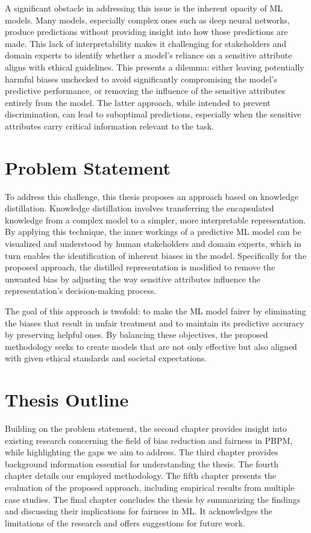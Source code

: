 A significant obstacle in addressing this issue is the inherent opacity of ML models.
Many models, especially complex ones such as deep neural networks,
produce predictions without providing insight into how those predictions are made.
This lack of interpretability makes it challenging for stakeholders and domain experts
to identify whether a model's reliance on a sensitive attribute aligns with ethical guidelines. 
This presents a dilemma:
either leaving potentially harmful biases unchecked to avoid significantly compromising
the model's predictive performance,
or removing the influence of the sensitive attributes entirely from the model.
The latter approach, while intended to prevent discrimination, can lead to suboptimal predictions,
especially when the sensitive attributes carry critical information relevant to the task.

\section{Problem Statement}
To address this challenge,
this thesis proposes an approach based on knowledge distillation.
Knowledge distillation involves transferring the encapsulated knowledge from a complex model to a simpler,
more interpretable representation.
By applying this technique,
the inner workings of a predictive ML model can be visualized
and understood by human stakeholders and domain experts,
which in turn enables the identification of inherent biases in the model.
Specifically for the proposed approach,
the distilled representation is modified to remove the unwanted bias
by adjusting the way sensitive attributes influence the representation's decision-making process.

The goal of this approach is twofold:
to make the ML model fairer by eliminating the biases that result in unfair treatment
and to maintain its predictive accuracy by preserving helpful ones.
By balancing these objectives,
the proposed methodology seeks to create models that are not only effective
but also aligned with given ethical standards and societal expectations.

\section{Thesis Outline}
Building on the problem statement,
the second chapter provides insight into existing research
concerning the field of bias reduction and fairness in PBPM,
while highlighting the gaps we aim to address.
The third chapter provides background information essential for understanding the thesis.
The fourth chapter details our employed methodology.
The fifth chapter presents the evaluation of the proposed approach,
including empirical results from multiple case studies.
The final chapter concludes the thesis by summarizing the findings
and discussing their implications for fairness in ML.
It acknowledges the limitations of the research and offers suggestions for future work.